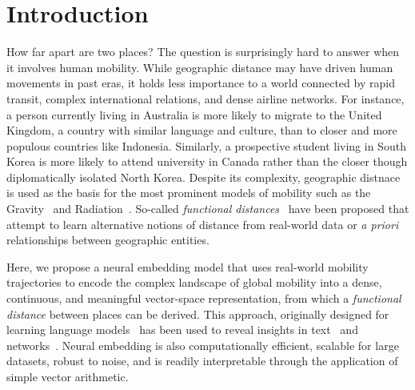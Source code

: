 \documentclass[12pt]{article} %
\begin{document}
%
%
\section{Introduction}\label{sec:introduction} %


How far apart are two places?
The question is surprisingly hard to answer when it involves human mobility.
While geographic distance may have driven human movements in past eras, it holds less importance to a world connected by rapid transit, complex international relations, and dense airline networks.
For instance, a person currently living in Australia is more likely to migrate to the United Kingdom, a country with similar language and culture, than to closer and more populous countries like Indonesia. 
Similarly, a prospective student living in South Korea is more likely to attend university in Canada rather than the closer though diplomatically isolated North Korea. 
Despite its complexity, geographic distnace is used as the basis for the most prominent models of mobility such as the Gravity~\autocite{zipf1946gravity} and Radiation~\autocite{simini2012universal}.
So-called \textit{functional distances}~\autocite{boschma2005proximity, brown1970functional, brown1970migration, kim2018functional} have been proposed that attempt to learn alternative notions of distance from real-world data or \textit{a priori} relationships between geographic entities. 

Here, we propose a neural embedding model that uses real-world mobility trajectories to encode the complex landscape of global mobility into a dense, continuous, and meaningful vector-space representation, from which a \textit{functional distance} between places can be derived.
This approach, originally designed for learning language models~\autocite{mikolov2013word2vec} has been used to reveal insights in text~\autocite{linzhuo2020hyperbolic, tshitoyan2019mat2vec, garg2018gender, kozlowski2018geometry, hamilton2016diachronic, le2014doc2vec, nakandala2016twitch} and networks~\autocite{perozzi2014deepwalk, grover2016node2vec}.
Neural embedding is also computationally efficient, scalable for large datasets, robust to noise, and is readily interpretable through the application of simple vector arithmetic. 
\end{document}
